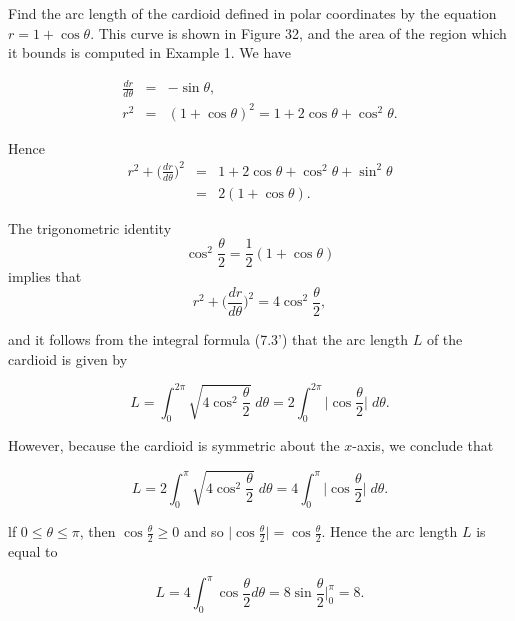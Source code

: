 \begin{example}
Find the arc length of the cardioid defined in polar coordinates by the equation $r = 1 + \cos \theta$. This curve is shown in Figure 32, and the area of the region which it bounds is computed in Example 1. We have

\begin{eqnarray*}
\frac{dr}{d\theta} &=& - \sin \theta,\\
r^2 &=& (1 + \cos \theta)^2 = 1 + 2 \cos \theta + \cos^2 \theta.
\end{eqnarray*}

\noindent Hence
\begin{eqnarray*}
r^2 + \Big( \frac{dr}{d \theta} \Big)^2 
&=& 1 + 2 \cos \theta + \cos^2 \theta + \sin^2 \theta \\
&=& 2(1 + \cos \theta). 
\end{eqnarray*}

\noindent The trigonometric identity 
$$
\cos^2 \frac{\theta}{2} = \frac{1}{2} (1 + \cos \theta) 
$$
\noindent implies that
$$
r^2 + \Big( \frac{dr}{d \theta} \Big)^2 = 4 \cos^2 \frac{\theta}{2} ,
$$

\noindent and it follows from the integral formula (7.3') that the arc length $L$ of the cardioid is given by

$$
L = \int_0^{2\pi} \sqrt{4\cos^2 \frac{\theta}{2}} \;d\theta = 2\int_0^{2\pi} \Big| \cos \frac{\theta}{2} \Big| \;d\theta.
$$

\noindent However, because the cardioid is symmetric about the $x$-axis, we conclude that

$$
L= 2 \int_0^\pi \sqrt{4\cos^2 \frac{\theta}{2}} \;d\theta = 4 \int_0^\pi \Big|\cos \frac{\theta}{2} \Big| \;d\theta. 
$$

\noindent lf $0 \leq \theta  \leq \pi$, then $\cos \frac{\theta}{2} \geq 0$ and so $\Big|\cos \frac{\theta}{2}\Big| = \cos \frac{\theta}{2}$. Hence the arc length $L$ is equal to

$$
L = 4\int_0^\pi \cos \frac{\theta}{2} d\theta = 8 \sin \frac{\theta}{2} \Big|_0^\pi = 8. 
$$
\end{example}
 
